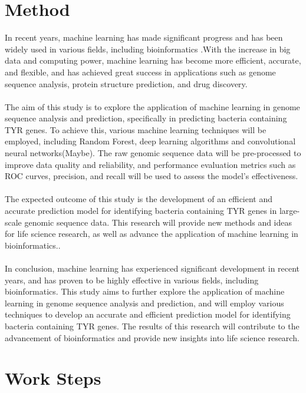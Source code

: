 \documentclass{article}
\begin{document}
\section{Method}
In recent years, machine learning has made significant progress and has been widely used in various fields, including bioinformatics .With the increase in big data and computing power, machine learning has become more efficient, accurate, and flexible, and has achieved great success in applications such as genome sequence analysis, protein structure prediction, and drug discovery\citep{moradigaravand2018prediction}.\\\\
The aim of this study is to explore the application of machine learning in genome sequence analysis and prediction, specifically in predicting bacteria containing TYR genes. To achieve this, various machine learning techniques will be employed, including Random Forest, deep learning algorithms and convolutional neural networks(Maybe). The raw genomic sequence data will be pre-processed to improve data quality and reliability, and performance evaluation metrics such as ROC curves, precision, and recall will be used to assess the model's effectiveness.\\\\
The expected outcome of this study is the development of an efficient and accurate prediction model for identifying bacteria containing TYR genes in large-scale genomic sequence data. This research will provide new methods and ideas for life science research, as well as advance the application of machine learning in bioinformatics\citep{moradigaravand2018prediction}..\\\\
In conclusion, machine learning has experienced significant development in recent years, and has proven to be highly effective in various fields, including bioinformatics. This study aims to further explore the application of machine learning in genome sequence analysis and prediction, and will employ various techniques to develop an accurate and efficient prediction model for identifying bacteria containing TYR genes. The results of this research will contribute to the advancement of bioinformatics and provide new insights into life science research.\\

\section{Work Steps}
\end{document}
